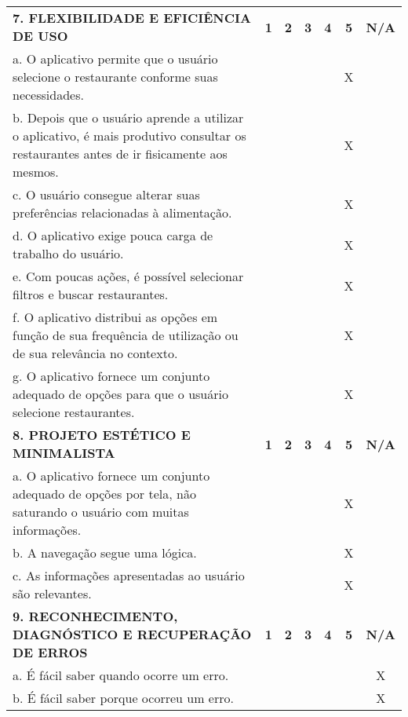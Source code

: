 \documentclass[portuguese,oneside]{tcc}
\begin{document}
\begin{center}
\begin{longtabu}{|L{25em}|c|c|c|c|c|c|}
																							\textbf{7. FLEXIBILIDADE E EFICIÊNCIA DE USO} & \textbf{1} & \textbf{2} & \textbf{3} & \textbf{4} & \textbf{5} & \textbf{N/A} \\ 
																							a. O aplicativo permite que o usuário selecione o restaurante conforme suas necessidades. & & & & & X & \\ 
																							b. Depois que o usuário aprende a utilizar o aplicativo, é mais produtivo consultar os restaurantes antes de ir fisicamente aos mesmos. & & & & & X & \\ 
																							c. O usuário consegue alterar suas preferências relacionadas à alimentação. & & & & & X & \\ 
																							d. O aplicativo exige pouca carga de trabalho do usuário. & & & & & X & \\ 
																							e. Com poucas ações, é possível selecionar filtros e buscar restaurantes. & & & & & X & \\ 
																							f. O aplicativo distribui as opções em função de sua frequência de utilização ou de sua relevância no contexto.	& & & & & X & \\ 
																							g. O aplicativo fornece um conjunto adequado de opções para que o usuário selecione restaurantes. & & & & & X & \\ 
																							\textbf{8. PROJETO ESTÉTICO E MINIMALISTA} & \textbf{1} & \textbf{2} & \textbf{3} & \textbf{4} & \textbf{5} & \textbf{N/A} \\ 
																							a. O aplicativo fornece um conjunto adequado de opções por tela, não saturando o usuário com muitas informações. & & & & & X & \\ 
																							b. A navegação segue uma lógica. & & & & & X & \\ 
																							c. As informações apresentadas ao usuário são relevantes. & & & & & X & \\ 
																							\textbf{9. RECONHECIMENTO, DIAGNÓSTICO E RECUPERAÇÃO DE ERROS} & \textbf{1} & \textbf{2} & \textbf{3} & \textbf{4} & \textbf{5} & \textbf{N/A} \\ 
																							a. É fácil saber quando ocorre um erro.	& & & & & & X \\ 
																							b. É fácil saber porque ocorreu um erro. & & & & & & X \\ 

\end{longtabu}
\end{center}
\end{document}
